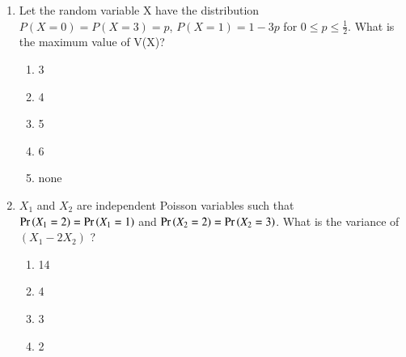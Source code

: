 \renewcommand{\theequation}{\theenumi}
\renewcommand{\thefigure}{\theenumi}
\renewcommand{\thetable}{\theenumi}
\begin{enumerate}[label=\thesection.\arabic*.,ref=\thesection.\theenumi]
%
\item Let the random variable X have the distribution $P(X=0)=P(X=3)=p$, $P(X=1)=1-3p$ for $0{\leq}p{\leq}\frac{1}{2}$. What is the maximum value of V(X)?
\begin{enumerate}[label=\Alph*)]
    \item 3
    \item 4
    \item 5
    \item 6
    \item none
\end{enumerate}
%
\solution

%
\item $X_1$ and $X_2$ are independent Poisson variables such that $\Pr\left(X_1=2\right) = \Pr\left(X_1=1\right)$ and $\Pr\left(X_2=2\right) = \Pr\left(X_2=3\right)$. What is the variance of $(X_1 - 2X_2)$ ?
\begin{enumerate}
    \item 14
    \item 4
    \item 3
    \item 2
\end{enumerate}
%
\solution


\end{enumerate}

